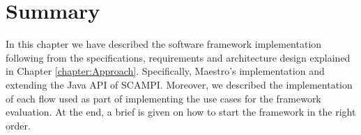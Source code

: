 \section{Summary}

In this chapter we have described the software framework implementation following from the specifications, requirements and architecture design explained in Chapter \ref{chapter:Approach}. Specifically, Maestro's implementation and extending the Java API of SCAMPI. Moreover, we described the implementation of each flow used as part of implementing the use cases for the framework evaluation. At the end,  a brief is given on how to start the framework in the right order.